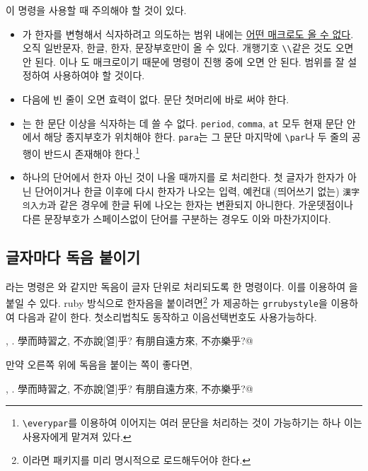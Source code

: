 \documentclass[a4paper,12pt,itemph,footnote]{oblivoir}
\begin{document}
이 명령을 사용할 때 주의해야 할 것이 있다. 
\begin{itemize} \firmlist
\item {}가 한자를 변형해서 식자하려고
의도하는 범위 내에는 \uline{어떤 매크로도 올 수 없다}. 오직 일반문자, 한글, 한자, 문장부호만이 올 수 있다.
개행기호 \verb|\\|같은 것도 오면 안 된다. 이나 도
매크로이기 때문에  명령이 진행 중에 오면 안 된다. 
범위를 잘 설정하여 사용하여야 할 것이다. 
\item {} 다음에 빈 줄이 오면 효력이 없다. 문단 첫머리에 바로 써야 한다.
\item {}는 한 문단 이상을 식자하는 데 쓸 수 없다. \texttt{period}, \texttt{comma}, \texttt{at} 모두 현재 문단 안에서 해당 종지부호가 위치해야 한다. \texttt{para}는 그 문단 마지막에 \verb|\par|나 두 줄의 공행이 반드시 존재해야 한다.\footnote{%
	\texttt{\textbackslash everypar}를 이용하여 이어지는 여러 문단을 처리하는 것이
	가능하기는 하나 이는 사용자에게 맡겨져 있다.}
\item 하나의 단어에서 한자 아닌 것이 나올 때까지를 로 처리한다.
첫 글자가 한자가 아닌 단어이거나 한글 이후에 다시 한자가 나오는 입력, 예컨대 (띄어쓰기 없는) \texttt{漢字의入力}과 같은 경우에 한글 뒤에 나오는 한자는 변환되지 아니한다. 가운뎃점이나 다른 문장부호가 스페이스없이 단어를 구분하는 경우도 이와 마찬가지이다.
\end{itemize}

\subsection{글자마다 독음 붙이기}\label{sec:everyhanja}

라는 명령은 와 같지만 독음이 글자
단위로 처리되도록 한 명령이다. 이를 이용하여 을 붙일 수 있다.
ruby 방식으로 한자음을 붙이려면\footnote{\XeTeX 이라면  패키지를 미리 명시적으로 로드해두어야 한다.}
가 제공하는 \texttt{grrubystyle}을 이용하여 다음과 같이
한다. 첫소리법칙도 동작하고 이음선택번호도 사용가능하다.
\begin{myexam}[]
\let\rwhanja=\rwhanjachar{}
\rwhanja{仁者樂[3]山}, \rwhanja{智者樂[3]水}.
學而時習之, 不亦說[열]乎? 有朋自遠方來, 不亦樂乎?@
\end{myexam}

만약 오른쪽 위에 독음을 붙이는 쪽이 좋다면,
\begin{myexam}[]
\let\rwhanja=\rwhanjachar{}
\rwhanja{仁者樂[3]山}, \rwhanja{智者樂[3]水}.
學而時習之, 不亦說[열]乎? 有朋自遠方來, 不亦樂乎?@
\end{myexam}
\end{document}
